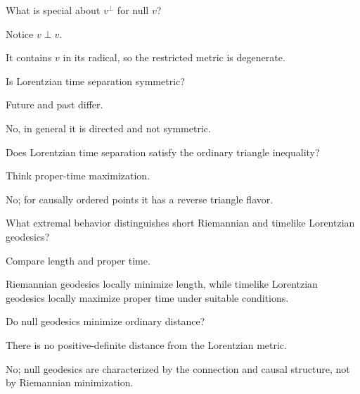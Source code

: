 \begin{exercise}\label{exr:vii30-17}
What is special about \(v^\perp\) for null \(v\)?
\end{exercise}
\begin{hint}
Notice \(v\perp v\).
\end{hint}
\begin{solution}
It contains \(v\) in its radical, so the restricted metric is degenerate.
\end{solution}

\begin{exercise}\label{exr:vii30-18}
Is Lorentzian time separation symmetric?
\end{exercise}
\begin{hint}
Future and past differ.
\end{hint}
\begin{solution}
No, in general it is directed and not symmetric.
\end{solution}

\begin{exercise}\label{exr:vii30-19}
Does Lorentzian time separation satisfy the ordinary triangle inequality?
\end{exercise}
\begin{hint}
Think proper-time maximization.
\end{hint}
\begin{solution}
No; for causally ordered points it has a reverse triangle flavor.
\end{solution}

\begin{exercise}\label{exr:vii30-20}
What extremal behavior distinguishes short Riemannian and timelike Lorentzian geodesics?
\end{exercise}
\begin{hint}
Compare length and proper time.
\end{hint}
\begin{solution}
Riemannian geodesics locally minimize length, while timelike Lorentzian geodesics locally maximize proper time under suitable conditions.
\end{solution}

\begin{exercise}\label{exr:vii30-21}
Do null geodesics minimize ordinary distance?
\end{exercise}
\begin{hint}
There is no positive-definite distance from the Lorentzian metric.
\end{hint}
\begin{solution}
No; null geodesics are characterized by the connection and causal structure, not by Riemannian minimization.
\end{solution}

